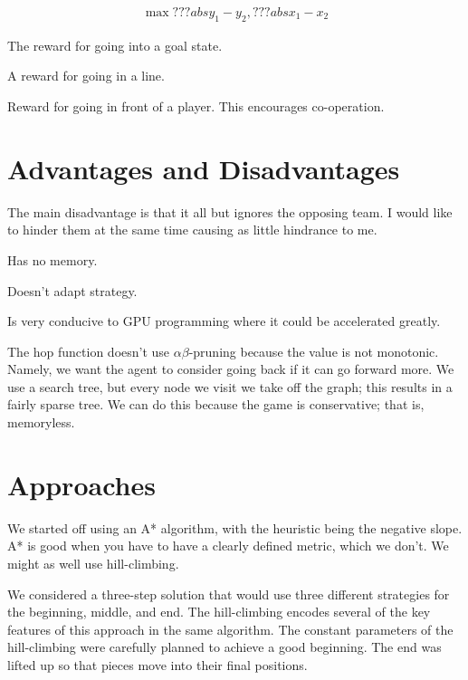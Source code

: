 \documentclass[twocolumn]{article}
\begin{document}
\begin{align}
\max{???abs{y_{1} - y_{2}}, ???abs{x_{1} - x_{2}}}\label{metric}
\end{align}

The reward for going into a goal state.

A reward for going in a line.

Reward for going in front of a player. This encourages co-operation.

\section{Advantages and Disadvantages}


The main disadvantage is that it all but ignores the opposing team. I would like to hinder them at the same time causing as little hindrance to me.

Has no memory.

Doesn't adapt strategy.

Is very conducive to GPU programming where it could be accelerated greatly.

The hop function doesn't use $\alpha\beta$-pruning because the value is not monotonic. Namely, we want the agent to consider going back if it can go forward more. We use a search tree, but every node we visit we take off the graph; this results in a fairly sparse tree. We can do this because the game is conservative; that is, memoryless.

\section{Approaches}


We started off using an A* algorithm, with the heuristic being the negative slope. A* is good when you have to have a clearly defined metric, which we don't. We might as well use hill-climbing.\cite{}

We considered a three-step solution that would use three different strategies for the beginning, middle, and end. The hill-climbing encodes several of the key features of this approach in the same algorithm. The constant parameters of the hill-climbing were carefully planned to achieve a good beginning. The end was lifted up so that pieces move into their final positions.
\end{document}
